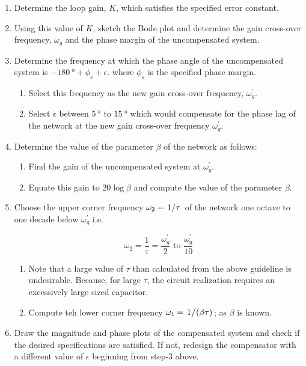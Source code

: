 \documentclass[
  14pt,
  a4paper,
  oneside,
  open=any,
  a4paper,
  14pt]{report}
\begin{document}
\begin{enumerate}
\def\labelenumi{\arabic{enumi}.}
\item
  Determine the loop gain, \(K\), which satisfies the specified error
  constant.
\item
  Using this value of \(K\), sketch the Bode plot and determine the gain
  cross-over frequency, \(\omega_g\) and the phase margin of the
  uncompensated system.
\item
  Determine the frequency at which the phase angle of the uncompensated
  system is \(\SI{-180}{\degree} + \phi_s + \epsilon\). where \(\phi_s\)
  is the specified phase margin.

  \begin{enumerate}
  \def\labelenumii{\alph{enumii})}
  \item
    Select this frequency as the new gain cross-over frequency,
    \(\omega_g^\prime\).
  \item
    Select \(\epsilon\) between \(\SI{5}{\degree}\) to
    \(\SI{15}{\degree}\) which would compensate for the phase lag of the
    network at the new gain cross-over frequency \(\omega_g^\prime\).
  \end{enumerate}
\item
  Determine the value of the parameter \(\beta\) of the network as
  follows:

  \begin{enumerate}
  \def\labelenumii{\alph{enumii})}
  \item
    Find the gain of the uncompensated system at \(\omega_g^\prime\).
  \item
    Equate this gain to \(20\log\beta\) and compute the value of the
    parameter \(\beta\).
  \end{enumerate}
\item
  Choose the upper corner frequency \(\omega_2 = \left.1\middle\slash\tau\right.\) of
  the network one octave to one decade below \(\omega_g^\prime\) i.e.

  \[
       \omega_2 = \dfrac{1}{\tau} = \dfrac{\omega_g^\prime}{2} \text{ to } \dfrac{\omega_g^\prime}{10}
   \]

  \begin{enumerate}
  \def\labelenumii{\alph{enumii})}
  \item
    Note that a large value of \(\tau\) than calculated from the above
    guideline is undesirable. Because, for large \(\tau\), the circuit
    realization requires an excessively large sized capacitor.
  \item
    Compute teh lower corner frequency
    \(\omega_1 = \left.1\middle\slash(\beta\tau)\right.\); as \(\beta\) is known.
  \end{enumerate}
\item
  Draw the magnitude and phase plots of the compensated system and check
  if the desired specifications are satisfied. If not, redesign the
  compensator with a different value of \(\epsilon\) beginning from
  step-3 above.
\end{enumerate}
\end{document}
